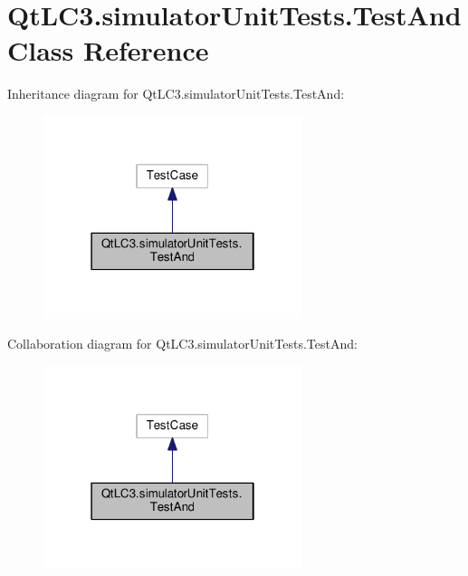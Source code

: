 \hypertarget{class_qt_l_c3_1_1simulator_unit_tests_1_1_test_and}{\section{Qt\-L\-C3.\-simulator\-Unit\-Tests.\-Test\-And Class Reference}
\label{class_qt_l_c3_1_1simulator_unit_tests_1_1_test_and}
}


Inheritance diagram for Qt\-L\-C3.\-simulator\-Unit\-Tests.\-Test\-And\-:
\nopagebreak
\begin{figure}[H]
\begin{center}
\leavevmode
\includegraphics[width=214pt]{class_qt_l_c3_1_1simulator_unit_tests_1_1_test_and__inherit__graph}
\end{center}
\end{figure}


Collaboration diagram for Qt\-L\-C3.\-simulator\-Unit\-Tests.\-Test\-And\-:
\nopagebreak
\begin{figure}[H]
\begin{center}
\leavevmode
\includegraphics[width=214pt]{class_qt_l_c3_1_1simulator_unit_tests_1_1_test_and__coll__graph}
\end{center}
\end{figure}
